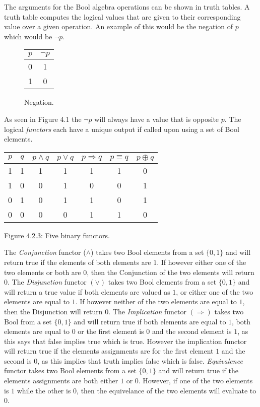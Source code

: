\documentclass[11pt,a4paper]{report}
\begin{document}
The arguments for the Bool algebra operations can be shown in truth tables. A truth table computes the logical values that are given to their corresponding value over a given operation. An example of this would be the negation of $p$ which would be $\neg p$.

\begin{figure}[H]
\centering
\label{tab:negation}
\begin{tabular}{|c|c|}
\hline
$p$ & $\neg p$\\ \hline
0 & 1 \\
1 & 0 \\
\hline
\end{tabular}
\caption{Negation.}
\end{figure}

As seen in Figure 4.1 the $\neg p$ will always have a value that is opposite $p$.
The logical \emph{functors} each have a unique output if called upon using a set of Bool elements.
\begin{center}
\begin{tabular}{|c|c||c|c|c|c|c|}
\hline
$p$ & $q$ & $p \land q$ & $p \lor q$ & $p \Rightarrow q$ & $p \equiv q$ & $p \oplus q$		\\ \hline
1 & 1 & 1 & 1 & 1 & 1 & 0\\
1 & 0 & 0 & 1 & 0 & 0 & 1\\
0 & 1 & 0 & 1 & 1 & 0 & 1\\
0 & 0 & 0 & 0 & 1 & 1 & 0\\
\hline
\end{tabular}
\end{center}
\begin{center}
\label{Figure:4.2.3}{Figure 4.2.3: Five binary functors.}
\end{center}
The \emph{Conjunction} functor ($\land$) takes two Bool elements from a set $\{0,1\}$ and will return true if the elements of both elements are $1$. If however either one of the two elements or both are $0$, then the Conjunction of the two elements will return $0$. The \emph{Disjunction} functor $(\lor)$ takes two Bool elements from a set $\{0,1\}$ and will return a true value if both elements are valued as $1$, or either one of the two elements are equal to $1$. If however neither of the two elements are equal to $1$, then the Disjunction will return $0$. The \emph{Implication} functor $(\Rightarrow)$ takes two Bool from a set $\{0,1\}$ and will return true if both elements are equal to $1$, both elements are equal to $0$ or the first element is $0$ and the second element is $1$, as this says that false implies true which is true. However the implication functor will return true if the elements assignments are for the first element $1$ and the second is $0$, as this implies that truth implies false which is false. \emph{Equivalence} functor takes two Bool elements from a set $\{0,1\}$ and will return true if the elements assignments are both either $1$ or $0$. However, if one of the two elements is $1$ while the other is $0$, then the equivelance of the two elements will evaluate to $0$.
\end{document}
